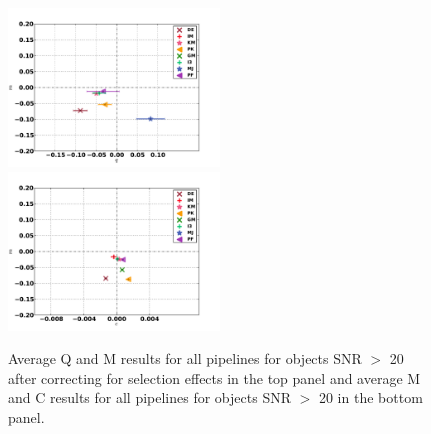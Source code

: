 \begin{figure}
\centering
\includegraphics[width=0.5\textwidth]{fig/QMC_main_sel_f.pdf} \\
\includegraphics[width=0.5\textwidth]{fig/MC_main_sel_f.pdf} 
\caption{Average Q and M results for all pipelines for objects 
SNR $>$ 20 after correcting for selection effects in the top
panel and average M and C results for all pipelines
for objects SNR $>$ 20 in the bottom panel.}
\label{fig:QMC_main_sel}
\end{figure}

